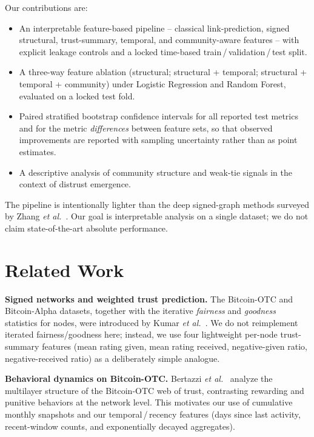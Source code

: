 \documentclass[conference]{IEEEtran}
\begin{document}
Our contributions are:
\begin{itemize}
\item An interpretable feature-based pipeline -- classical
link-prediction, signed structural, trust-summary, temporal, and
community-aware features -- with explicit leakage controls and a
locked time-based train\,/\,validation\,/\,test split.
\item A three-way feature ablation (structural; structural + temporal;
structural + temporal + community) under Logistic Regression and
Random Forest, evaluated on a locked test fold.
\item Paired stratified bootstrap confidence intervals for all
reported test metrics and for the metric \emph{differences} between
feature sets, so that observed improvements are reported with sampling
uncertainty rather than as point estimates.
\item A descriptive analysis of community structure and weak-tie
signals in the context of distrust emergence.
\end{itemize}

The pipeline is intentionally lighter than the deep signed-graph
methods surveyed by Zhang \emph{et al.}~\cite{zhang2024}. Our goal is
interpretable analysis on a single dataset; we do not claim
state-of-the-art absolute performance.

\section{Related Work}

\textbf{Signed networks and weighted trust prediction.} The
Bitcoin-OTC and Bitcoin-Alpha datasets, together with the iterative
\emph{fairness} and \emph{goodness} statistics for nodes, were
introduced by Kumar \emph{et al.}~\cite{kumar2016}. We do not
reimplement iterated fairness/goodness here; instead, we use four
lightweight per-node trust-summary features (mean rating given, mean
rating received, negative-given ratio, negative-received ratio) as a
deliberately simple analogue.

\textbf{Behavioral dynamics on Bitcoin-OTC.} Bertazzi
\emph{et al.}~\cite{bertazzi2018} analyze the multilayer structure of
the Bitcoin-OTC web of trust, contrasting rewarding and punitive
behaviors at the network level. This motivates our use of cumulative
monthly snapshots and our temporal\,/\,recency features (days since
last activity, recent-window counts, and exponentially decayed
aggregates).
\end{document}
